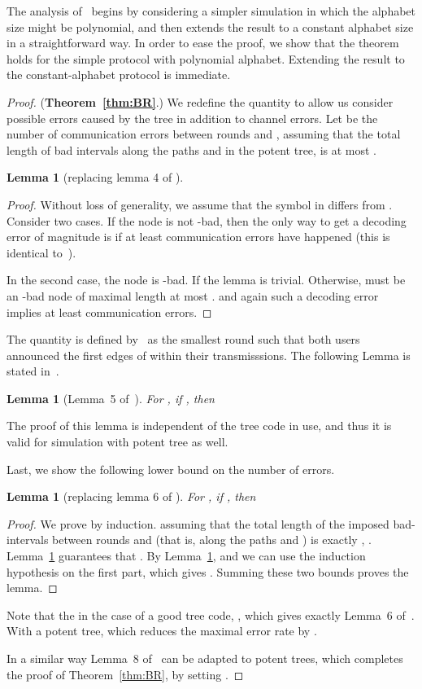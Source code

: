 \documentclass[ letterpaper, 11pt]{article}
\newtheorem{lemma}[theorem]{Lemma}
\newcommand{\potent}{potent\xspace}
\begin{document}
The analysis of~\cite{BR10} begins by considering a simpler simulation in which the alphabet
size might be polynomial, and then extends the result to a constant alphabet size in a straightforward way. In order to ease the proof, we show that the theorem holds for the simple protocol with polynomial alphabet. Extending the result to the constant-alphabet protocol is immediate.

\begin{proof} (\textbf{Theorem~\ref{thm:BR}}.)
We redefine the quantity  to allow us consider possible errors caused by the tree in addition to   channel errors. Let   be the number of communication errors between rounds  and , assuming that the total length of bad intervals along the paths  and  in the potent tree, is at most .


\begin{lemma}[replacing lemma 4 of \cite{BR10}]\label{lem:4}

\end{lemma}
\begin{proof}
Without loss of generality, we assume that the  symbol in  differs from . Consider two cases. If the node  is not -bad,
then the only way to get a decoding error of magnitude  is if at least
 communication errors have happened (this is identical to~\cite{BR10}).

In the second case, the node  is -bad.
If  the lemma is trivial.
Otherwise,  must be an -bad node of maximal length at most .
 and again such a decoding error
implies at least  communication errors.
\end{proof}

The quantity  is defined by~\cite{BR10} as the smallest round  such that both users announced 
the first  edges of  within their transmisssions. The following Lemma is stated in~\cite{BR10}.
\begin{lemma}[Lemma~5 of~\cite{BR10}]\label{lem:5}
For , if , then 
\end{lemma}
\noindent The proof of this lemma is independent of the tree code in use, and thus it is valid for simulation with potent tree as well.

Last, we show the following lower bound on the number of errors.
\begin{lemma}[replacing lemma 6 of \cite{BR10}]\label{lem:6}
For , if , then 
\end{lemma}

\begin{proof}
We prove by induction. 
assuming that the total length of the imposed bad-intervals between
rounds  and  (that is, along the paths  and )
is exactly , .
Lemma~\ref{lem:4} guarantees that .
By Lemma~\ref{lem:5},  and we can use the induction hypothesis on the first part, which gives
. Summing these two bounds proves the lemma.
\end{proof}
\noindent Note that the in the case of a good tree code, , which gives exactly Lemma~6 of~\cite{BR10}. With a \potent tree,  which reduces the maximal error rate by .

In a similar way Lemma~8 of~\cite{BR10} can be adapted to potent trees, which completes the proof of Theorem~\ref{thm:BR}, by setting .

\end{proof}
\end{document}
